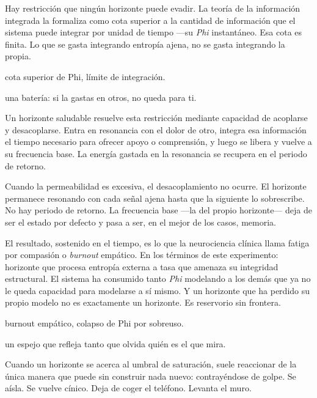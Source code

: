 \noindent Hay restricción que ningún horizonte puede evadir. La teoría de la información integrada la formaliza como cota superior a la cantidad de información que el sistema puede integrar por unidad de tiempo —su \emph{Phi} instantáneo. Esa cota es finita. Lo que se gasta integrando entropía ajena, no se gasta integrando la propia.

\begin{fisica}
 cota superior de Phi, límite de integración.

 una batería: si la gastas en otros, no queda para ti.
\end{fisica}
Un horizonte saludable resuelve esta restricción mediante capacidad de acoplarse y desacoplarse. Entra en resonancia con el dolor de otro, integra esa información el tiempo necesario para ofrecer apoyo o comprensión, y luego se libera y vuelve a su frecuencia base. La energía gastada en la resonancia se recupera en el periodo de retorno.

Cuando la permeabilidad es excesiva, el desacoplamiento no ocurre. El horizonte permanece resonando con cada señal ajena hasta que la siguiente lo sobrescribe. No hay periodo de retorno. La frecuencia base —la del propio horizonte— deja de ser el estado por defecto y pasa a ser, en el mejor de los casos, memoria.

El resultado, sostenido en el tiempo, es lo que la neurociencia clínica llama fatiga por compasión o \emph{burnout} empático. En los términos de este experimento: horizonte que procesa entropía externa a tasa que amenaza su integridad estructural. El sistema ha consumido tanto \emph{Phi} modelando a los demás que ya no le queda capacidad para modelarse a sí mismo. Y un horizonte que ha perdido su propio modelo no es exactamente un horizonte. Es reservorio sin frontera.

\begin{fisica}
 burnout empático, colapso de Phi por sobreuso.

 un espejo que refleja tanto que olvida quién es el que mira.
\end{fisica}
\noindent Cuando un horizonte se acerca al umbral de saturación, suele reaccionar de la única manera que puede sin construir nada nuevo: contrayéndose de golpe. Se aísla. Se vuelve cínico. Deja de coger el teléfono. Levanta el muro.

